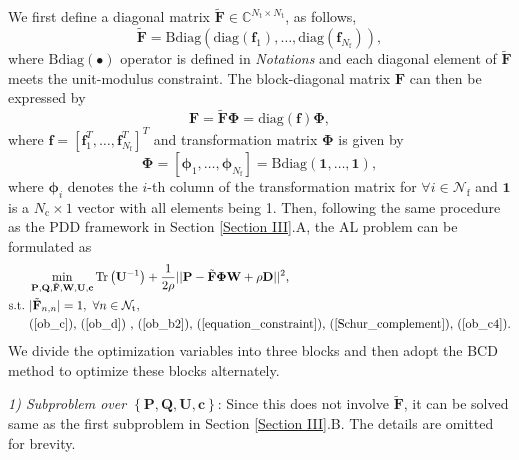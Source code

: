 \documentclass[10pt,journal,twocolumn]{IEEEtran}
\begin{document}
We first define  a diagonal matrix $\tilde{\mathbf{F}}\in\mathbb{C}^{N_{\text{t}}\times N_{\text{t}}}$, as follows, 
\begin{equation}
\tilde{\mathbf{F}}=\text{Bdiag}\left(\text{diag}\left(\mathbf{f}_1\right),\dots,\text{diag}\left(\mathbf{f}_{N_{\text{f}}}\right)\right),
\label{diagonal}
\end{equation}
where $\text{Bdiag}\left( \bullet\right)$ operator is defined in \emph{Notations} and  each diagonal element of $\tilde{\mathbf{F}}$ meets the unit-modulus constraint. The block-diagonal matrix $\mathbf{F}$ can then  be expressed by 
\begin{equation}
\mathbf{F} = \tilde{\mathbf{F}}\mathbf{\Phi} = \text{diag}\left(\mathbf{f}\right)\mathbf{\Phi},
\label{A}
\end{equation}
where $\mathbf{f}=\left[\mathbf{f}^T_1,\dots,\mathbf{f}^T_{N_{\text{f}}}\right]^T$ and transformation matrix $\mathbf{\Phi}$ is given by
\begin{equation}
\mathbf{\Phi} =\left[{\boldsymbol{\phi}}_1,\dots,\boldsymbol{\phi}_{N_{\text{f}}}\right]=\text{Bdiag}\left(\mathbf{1},\dots,\mathbf{1}\right),
\label{A}
\end{equation} where $\boldsymbol{\phi}_i$ denotes the $i$-th column of the transformation matrix for $\forall i\in\mathcal{N}_{\text{f}}$ and $\mathbf{1}$ is a $N_{\text{c}}\times 1$ vector with all elements being 1. Then, following the same procedure as the PDD framework in Section \ref{Section III}.A, the AL problem can be formulated as
\begin{subequations}\label{linear_p13}
	\begin{align}
&\min_{\mathbf{P},\mathbf{Q},\tilde{\mathbf{F}},\mathbf{W},\mathbf{U},\mathbf{c} } \text{Tr}\left(\mathbf{U}^{-1}\right)+\frac{1}{2\rho}||\mathbf{P}-\tilde{\mathbf{F}} \mathbf{\Phi W}+\rho\mathbf{D}||^2,\label{ob_a13}\\
	\text{s.t.}~
 &|\tilde{\mathbf{F}}_{n,n}|=1,~\forall n\in\mathcal{N}_{\text{t}},\label{ob_b13}\\
  &\mbox{(\ref{ob_c}),~(\ref{ob_d})
  ,~(\ref{ob_b2}),~(\ref{equation_constraint}),~(\ref{Schur_complement}),~(\ref{ob_c4})}.\label{ob_c13}
	\end{align}
\end{subequations}
We divide the optimization variables into three blocks and then adopt the BCD method to optimize these blocks alternately\cite{10587118}.

\emph{1) Subproblem over $\left\{\mathbf{P},\mathbf{Q},\mathbf{U},\mathbf{c}\right\}$}: Since this does not involve $\tilde{\mathbf{F}}$, it can be solved same as the first subproblem in Section \ref{Section III}.B. The details are omitted for brevity.
\end{document}
